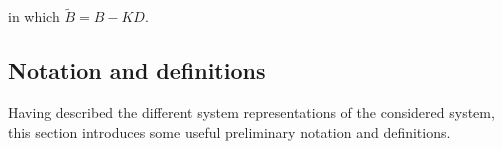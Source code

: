 in which $\tilde{B}=B-KD$.
%
%
%
\subsection{Notation and definitions}\label{sec:notation}
Having described the different system representations of the considered system, this section introduces some useful preliminary notation and definitions.
%

